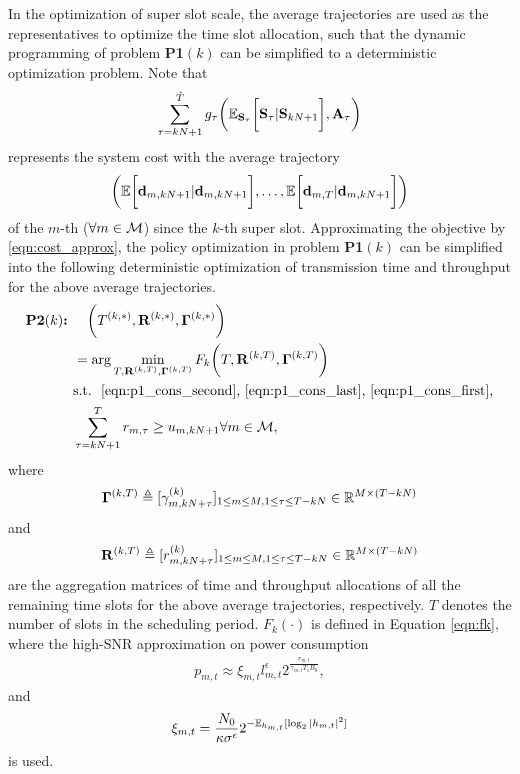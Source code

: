 In the optimization of super slot scale, the average trajectories are used as the representatives to optimize the time slot allocation, such that the dynamic programming of problem \textbf{P1$(k)$} can be simplified to a deterministic optimization problem.
Note that
\begin{align}
    \sum_{\tau=kN+1}^{{\hat{T}}} g_{\tau}\bigg(
        \mathbb{E}_{\mathbf{S}_{\tau}}\bigg[ \mathbf{S}_{\tau} | \mathbf{S}_{kN+1} \bigg], \mathbf{A}_{\tau}
    \bigg)
    \label{eqn:cost_approx}
\end{align}
represents the system cost with the average trajectory
\begin{align}
    \bigg(
        \mathbb{E}\bigg[ \mathbf{d}_{m,kN+1} | \mathbf{d}_{m,kN+1} \bigg],
        \dots,
        \mathbb{E}\bigg[ \mathbf{d}_{m,T} | \mathbf{d}_{m,kN+1} \bigg]
    \bigg)
\end{align}
of the $m$-th {\IAV} ($\forall m\in\mathcal{M}$) since the $k$-th super slot. Approximating the objective by \eqref{eqn:cost_approx}, the policy optimization in problem \textbf{P1$(k)$} can be simplified into the following deterministic optimization of transmission time and throughput for the above average trajectories.
    \begin{align}
        \textbf{P2$(k)$:~} &
        ~~~\bigg(T^{(k,*)}, \mathbf{R}^{(k,*)}, \mathbf{\Gamma}^{(k,*)} \bigg)\nonumber \\
        & = \arg\min_{ T, \mathbf{R}^{(k,T)}, \mathbf{\Gamma}^{(k,T)} } F_k\bigg( T, \mathbf{R}^{(k,T)}, \mathbf{\Gamma}^{(k,T)} \bigg)\nonumber
            \\
        &\text{s.t.~} \text{ \eqref{eqn:p1_cons_second}, \eqref{eqn:p1_cons_last}, \eqref{eqn:p1_cons_first},}
        \\
    & \sum_{ \tau=kN+1 }^{ T } r_{m,\tau} \geq {u}_{m,kN+1} \forall m\in\mathcal{M}, \label{eqn:constraint_T}
    \end{align}
where
$$
\mathbf{\Gamma}^{(k,T)} \triangleq [ \gamma^{(k)}_{m,kN+\tau} ]_{1 \leq m \leq M, 1 \leq \tau \leq T-kN} \in \mathbb{R}^{M \times (T-kN)}
$$
and
$$\mathbf{R}^{(k,T)} \triangleq [ r^{(k)}_{m,kN+\tau}]_{1 \leq m \leq M, 1 \leq \tau \leq T-kN} \in \mathbb{R}^{M \times (T-kN)}$$
are the aggregation matrices of time and throughput allocations of all the remaining time slots for the above average trajectories, respectively. $T$ denotes the number of slots in the scheduling period. $F_k(\cdot)$ is defined in Equation \eqref{eqn:fk}, where the high-SNR approximation on power consumption
\begin{align}
    p_{m,t} \approx \xi_{m,t} l_{m,t}^{\epsilon} 2^{\frac{ r_{m,t} }{ \gamma_{m,t} T_{s} B_0 }},
\end{align}
and $$\xi_{m,t} = \frac{N_0}{\kappa \sigma^\epsilon} 2^{-\mathbb{E}_{h_{m,t}}[\log_2{|h_{m,t}|^2}]}$$ is used.


